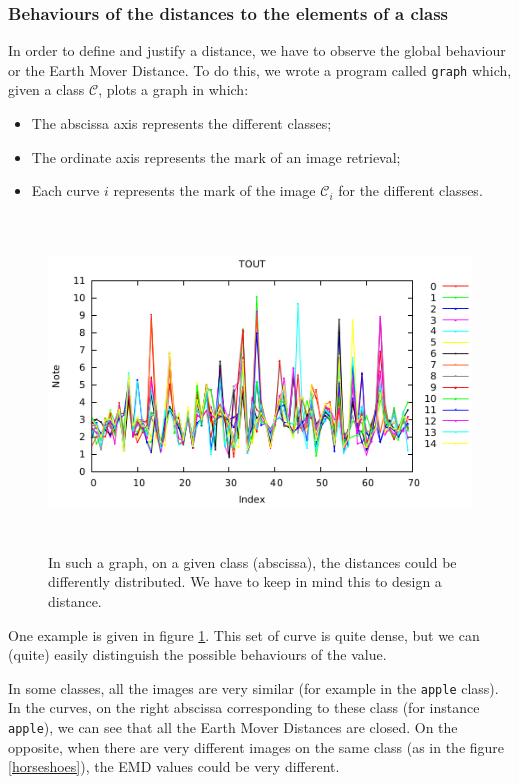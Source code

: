 \subsubsection{Behaviours of the distances to the elements of a class}

In order to define and justify a distance, we have to observe the global behaviour or the Earth Mover Distance. To do this, we wrote a program called \texttt{graph} which, given a class $\mathcal{C}$, plots a graph in which:
\begin{itemize}
	\item The abscissa axis represents the different classes;
	\item The ordinate axis represents the mark of an image retrieval;
	\item Each curve $i$ represents the mark of the image $\mathcal{C}_i$ for the different classes. 
\end{itemize}

\begin{figure}[!ht]
    \centering
    \includegraphics[height=250pt]{images/plot_1.eps}
	\caption{In such a graph, on a given class (abscissa), the distances could be differently distributed. We have to keep in mind this to design a distance.}
	\label{graph}
\end{figure}


One example is given in figure \ref{graph}. This set of curve is quite dense, but we can (quite) easily distinguish the possible behaviours of the value.

In some classes, all the images are very similar (for example in the \texttt{apple} class). In the curves, on the right abscissa corresponding to these class (for instance \texttt{apple}), we can see that all the Earth Mover Distances are closed. On the opposite, when there are very different images on the same class (as in the figure \ref{horseshoes}), the EMD values could be very different.

